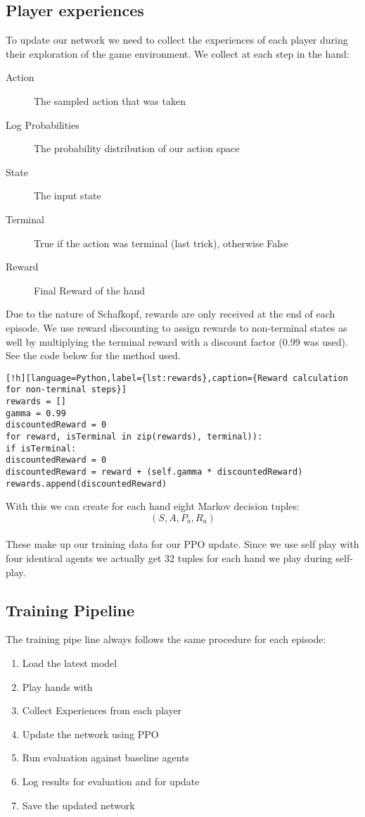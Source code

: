 \subsection{Player experiences}
To update our network we need to collect the experiences of each player during their exploration of the game
environment.
We collect at each step in the hand:
\begin{description}
\item[Action] The sampled action that was taken
\item[Log Probabilities] The probability distribution of our action space
\item[State] The input state
\item[Terminal] True if the action was terminal (last trick), otherwise False
\item[Reward] Final Reward of the hand
\end{description}
Due to the nature of Schafkopf, rewards are only received at the end of each episode.
We use reward discounting to assign rewards to non-terminal states as well by multiplying the terminal reward with a
discount factor (0.99 was used). See the code below for the method used.
\begin{lstlisting}[!h][language=Python,label={lst:rewards},caption={Reward calculation for non-terminal steps}]
rewards = []
gamma = 0.99
discountedReward = 0
for reward, isTerminal in zip(rewards), terminal)):
if isTerminal:
discountedReward = 0
discountedReward = reward + (self.gamma * discountedReward)
rewards.append(discountedReward)
\end{lstlisting}
With this we can create for each hand eight Markov decision tuples: \[(S,A,P_{a},R_{a})\]\\
These make up our training data for our PPO update.
Since we use self play with four identical agents we actually get 32 tuples for each hand we play during self-play.

\subsection{Training Pipeline}
The training pipe line always follows the same procedure for each episode:
\begin{enumerate}
\item Load the latest model
\item Play hands with
\item Collect Experiences from each player
\item Update the network using PPO
\item Run evaluation against baseline agents
\item Log results for evaluation and for update
\item Save the updated network
\end{enumerate}



